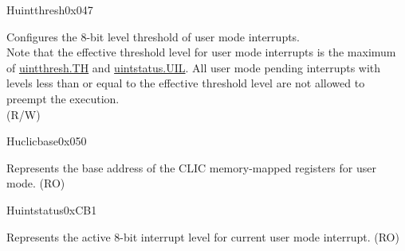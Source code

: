 \begin{register}{H}{uintthresh}{0x047}\label{regdesc:UINTTHRESH}
%
%
\regnewline%
\begin{regdesc}\begin{reglist}
\label{fielddesc:UINTTHRESH_TH}\item [TH] Configures the 8-bit level threshold of user mode interrupts. \\
Note that the effective threshold level for user mode interrupts is the maximum of \hyperref[fielddesc:UINTTHRESH_TH]{{uintthresh.TH}} and \hyperref[fielddesc:UINTSTATUS_UIL]{{uintstatus.UIL}}. All user mode pending interrupts with levels less than or equal to the effective threshold level are not allowed to preempt the execution.\\ (R/W)
\end{reglist}\end{regdesc}
\end{register}

\begin{register}{H}{uclicbase}{0x050}\label{regdesc:UCLICBASE_REG}
%
\regnewline%
\begin{regdesc}\begin{reglist}
\label{fielddesc:UCLICBASE}\item [UCLICBASE] Represents the base address of the CLIC memory-mapped registers for user mode. (RO)
\end{reglist}\end{regdesc}
\end{register}

\begin{register}{H}{uintstatus}{0xCB1}
\label{regdesc:UINTSTATUS}
%
%
\regnewline%
\begin{regdesc}\begin{reglist}
\label{fielddesc:UINTSTATUS_UIL}\item [UIL] Represents the active 8-bit interrupt level for current user mode interrupt.   (RO)
\end{reglist}\end{regdesc}
\end{register}




